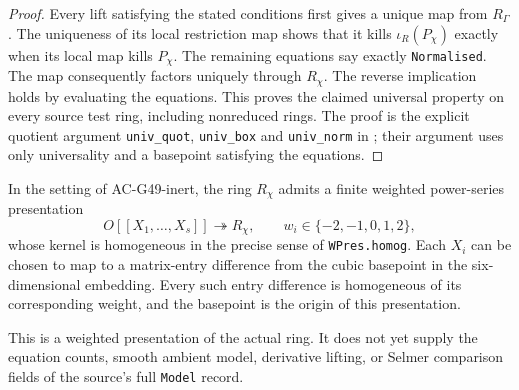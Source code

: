 \begin{proof}
Every lift satisfying the stated conditions first gives a
unique map from $R_\Gamma$.  The uniqueness of its local
restriction map shows that it kills $\iota_R(P_\chi)$
exactly when its local map kills $P_\chi$.
The remaining equations say exactly \texttt{Normalised}.
The map consequently factors uniquely through $R_\chi$.
The reverse implication holds by evaluating the equations.
This proves the claimed universal property on every source
test ring, including nonreduced rings.
The proof is the explicit quotient argument
\texttt{univ\_quot}, \texttt{univ\_box} and
\texttt{univ\_norm} in
; their argument uses
only universality and a basepoint satisfying the equations.
\end{proof}

\begin{corollary}
\label{AC-G49-grading}
In the setting of AC-G49-inert, the ring $R_\chi$ admits a
finite weighted power-series presentation
\[
  O[[X_1,\ldots,X_s]]\twoheadrightarrow R_\chi,
       \qquad w_i\in\{-2,-1,0,1,2\},                         \tag{G49.11}
\]
whose kernel is homogeneous in the precise sense of
\texttt{WPres.homog}.  Each $X_i$ can be chosen to map to
a matrix-entry difference from the cubic basepoint in the
six-dimensional embedding.  Every such entry difference
is homogeneous of its corresponding weight, and the
basepoint is the origin of this presentation.

This is a weighted presentation of the actual ring.
It does not yet supply the equation counts, smooth ambient
model, derivative lifting, or Selmer comparison fields of
the source's full \texttt{Model} record.
\end{corollary}
